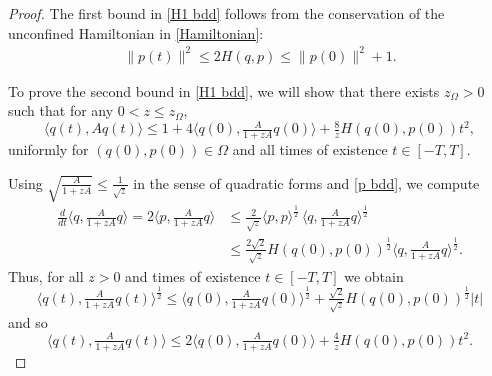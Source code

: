 \documentclass{amsart}
\theoremstyle{definition}
\numberwithin{equation}{section}
\newcommand{\la}{\langle}
\newcommand{\ra}{\rangle}
\begin{document}
\begin{proof}
The first bound in \eqref{H1 bdd} follows from the conservation of the unconfined Hamiltonian in \eqref{Hamiltonian}:
\begin{align}\label{p bdd}
\|p(t)\|^2\leq 2H(q,p)\leq \|p(0)\|^2+1.
\end{align}

To prove the second bound in \eqref{H1 bdd}, we will show that there exists $z_\Omega >0$ such that for any $0<z\leq z_{\Omega}$,
\begin{equation}\label{eq:boundqAq_equicontinuity}
\la q(t), Aq(t) \ra \leq 1 + 4\langle q(0), \tfrac{A}{1+zA}q(0)\rangle + \tfrac{8}{z}H(q(0),p(0)) t^2,
\end{equation}
uniformly for $(q(0),p(0))\in \Omega$ and all times of existence $t\in [-T,T]$. 

Using $\sqrt{\frac{A}{1+zA}} \leq \frac{1}{\sqrt{z}}$ in the sense of quadratic forms and \eqref{p bdd}, we compute
\begin{align*}
\tfrac{d}{dt}\langle q, \tfrac{A}{1+zA}q\rangle = 2 \langle p,\tfrac{A}{1+zA} q\rangle
&\leq \tfrac{2}{\sqrt{z}} \la p, p \ra^{\frac12}\, \langle q,\tfrac{A}{1+zA}q\rangle^{\frac12}\\
&\leq \tfrac{2\sqrt2}{\sqrt z} H(q(0),p(0))^{\frac12}\langle q,\tfrac{A}{1+zA}q\rangle^{\frac12}.
\end{align*}
Thus, for all $z>0$ and times of existence $t\in [-T,T]$ we obtain
\begin{equation*}
\langle q(t), \tfrac{A}{1+zA}q(t)\rangle^{\frac12} \leq   \langle q(0), \tfrac{A}{1+zA}q(0)\rangle^{\frac12} + \tfrac{\sqrt2}{\sqrt{z}}H(q(0),p(0))^{\frac12} |t|
\end{equation*}
and so
\begin{equation}\label{eq:boundqAq}
\langle q(t), \tfrac{A}{1+zA}q(t)\rangle \leq   2\langle q(0), \tfrac{A}{1+zA}q(0)\rangle + \tfrac{4}{z}H(q(0),p(0)) t^2.
\end{equation}


\end{proof}
\end{document}
